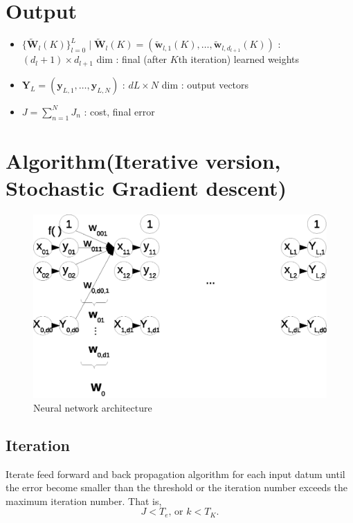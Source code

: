 \documentclass{article}
\begin{document}
\section{Output}
\begin{itemize}
\item $\{\bm{\tilde{W}}_l(K)\}_{l=0}^L \mid \bm{\tilde{W}}_l(K) = (\bm{\tilde{w}}_{l,1}(K),\dots ,
  \bm{\tilde{w}}_{l,d_{l+1}}(K))$ : $(d_l+1) \times d_{l+1}$ dim :
  final (after $K$th iteration) learned weights
\item $\bm{Y}_L = (\bm{y}_{L,1},\dots , \bm{y}_{L,N})$ :
  $dL \times N$ dim : output vectors
\item $J = \sum_{n=1}^N J_n$
  : cost, final error
\end{itemize}

\section{Algorithm(Iterative version, Stochastic Gradient descent)}
\begin{figure}
  \centering
  \includegraphics[width=1.0\textwidth]{neuralnet_architecture}
  \caption{Neural network architecture}
  \label{fig:nn}
\end{figure}
\subsection{Iteration}
Iterate feed forward and back propagation algorithm for each input
datum until the error become smaller than the threshold or the
iteration number exceeds the
maximum iteration number. 
That is, 
\begin{equation}
  J < T_e \mbox{, or } k < T_K.
\end{equation}
\end{document}
